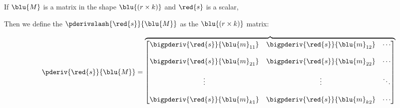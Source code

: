         
        \begin{definition}
            If $\blu{M}$ is a matrix in the shape $\blu{ (r \times k) }$ and $\red{s}$ is a scalar,
            
            Then we define the  $\pderivslash{ \red{s} }{ \blu{M} }$ as the $\blu{ (r \times k) }$ matrix:
            
            \begin{equation*}
                \pderiv{ \red{s} }{ \blu{M} }
                =
                \overbrace{
                    \begin{bmatrix}
                        \begin{matrix}
                            \bigpderiv{ \red{s} } { \blu{m}_{11} }\\ 
                            \\
                            \bigpderiv{ \red{s} } { \blu{m}_{21} }\\ 
                            \\
                            \vdots \\ 
                            \\
                            \bigpderiv{ \red{s} } { \blu{m}_{k1} }
                        \end{matrix} 
                        &
                        \begin{matrix}
                            \bigpderiv{ \red{s} } { \blu{m}_{12} }\\ 
                            \\
                            \bigpderiv{ \red{s} } { \blu{m}_{22} }\\ 
                            \\
                            \vdots \\ 
                            \\
                            \bigpderiv{ \red{s} } { \blu{m}_{k2} }
                        \end{matrix}
                        &
                        \begin{matrix}
                            \cdots\\\\ \cdots \\\\ \ddots \\\\ \cdots
                        \end{matrix} 

\end{bmatrix}}
\end{equation*}
\end{definition}
